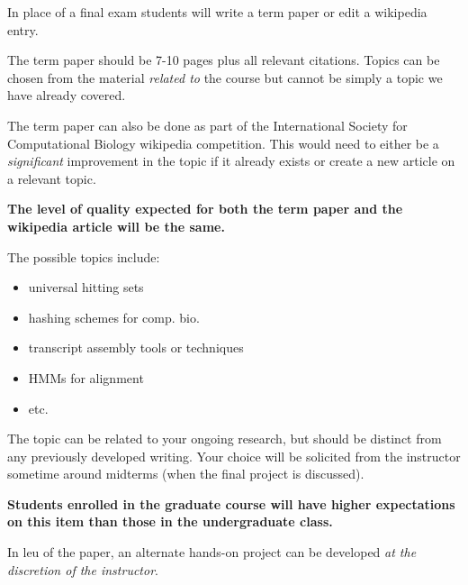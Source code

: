 \documentclass[12pt]{scrartcl}
\begin{document}
In place of a final exam students will write a term paper or edit a wikipedia entry. 

The term paper should be 7-10 pages plus all relevant citations.
Topics can be chosen from the material \textit{related to} the course but cannot be simply a topic we have already covered. 

The term paper can also be done as part of the International Society for Computational Biology wikipedia competition.
This would need to either be a \textit{significant} improvement in the topic if it already exists or create a new article on a relevant topic. 

\textbf{The level of quality expected for both the term paper and the wikipedia article will be the same.}

The possible topics include: 
\begin{itemize}
\item universal hitting sets
\item hashing schemes for comp. bio. 
\item transcript assembly tools or techniques
\item HMMs for alignment
\item etc. 
\end{itemize}
The topic can be related to your ongoing research, but should be distinct from any previously developed writing. 
Your choice will be solicited from the instructor sometime around midterms (when the final project is discussed). 

\textbf{Students enrolled in the graduate course will have higher expectations on this item than those in the undergraduate class.}

In leu of the paper, an alternate hands-on project can be developed \textit{at the discretion of the instructor}. 

%
\end{document}
